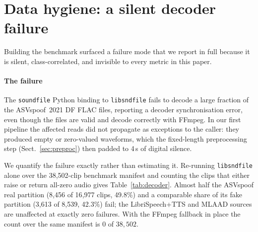 \documentclass[sn-mathphys-num,pdflatex]{sn-jnl}
\begin{document}
\section{Data hygiene: a silent decoder failure}\label{sec:hygiene}

Building the benchmark surfaced a failure mode that we report in full because it
is silent, class-correlated, and invisible to every metric in this paper.

\paragraph{The failure}
The \texttt{soundfile} Python binding to \texttt{libsndfile} fails to decode a
large fraction of the ASVspoof~2021 DF FLAC files, reporting a decoder
synchronisation error, even though the files are valid and decode correctly with
FFmpeg. In our first pipeline the affected reads did not propagate as
exceptions to the caller: they produced empty or zero-valued waveforms, which the
fixed-length preprocessing step (Sect.~\ref{sec:preproc}) then padded to 4\,s of
digital silence.

We quantify the failure exactly rather than estimating it. Re-running
\texttt{libsndfile} alone over the 38{,}502-clip benchmark manifest and counting
the clips that either raise or return all-zero audio gives
Table~\ref{tab:decoder}. Almost half the ASVspoof real partition
(8{,}456 of 16{,}977 clips, 49.8\%) and a comparable share of its fake partition
(3{,}613 of 8{,}539, 42.3\%) fail; the LibriSpeech+TTS and MLAAD sources are
unaffected at exactly zero failures. With the FFmpeg fallback in place the
count over the same manifest is $0$ of $38{,}502$.
\end{document}
